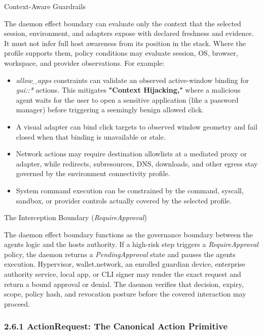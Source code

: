 \documentclass[
  11pt,
]{article}
\providecommand{\tightlist}{%
  \setlength{\itemsep}{0pt}\setlength{\parskip}{0pt}}
\begin{document}
Context-Aware Guardrails

The daemon effect boundary can evaluate only the context that the selected
session, environment, and adapters expose with declared freshness and evidence.
It must not infer full host awareness from its position in the stack. Where the
profile supports them, policy conditions may evaluate session, OS, browser,
workspace, and provider observations. For example:

\begin{itemize}
\tightlist
\item
  \emph{allow\_apps} constraints can validate an observed active-window binding
  for \emph{gui::*} actions. This mitigates \textbf{"Context Hijacking,"}
  where a malicious agent waits for the user to open a sensitive
  application (like a password manager) before triggering a seemingly
  benign allowed click.
\item
  A visual adapter can bind click targets to observed window geometry and fail
  closed when that binding is unavailable or stale.
\item
  Network actions may require destination allowlists at a mediated proxy or
  adapter, while redirects, subresources, DNS, downloads, and other egress stay
  governed by the environment connectivity profile.
\item
  System command execution can be constrained by the command, syscall,
  sandbox, or provider controls actually covered by the selected profile.
\end{itemize}

The Interception Boundary (\emph{RequireApproval})

The daemon effect boundary functions as the governance boundary between
the agent\textquotesingle s logic and the host\textquotesingle s
authority.
If a high-risk step triggers a \emph{RequireApproval} policy, the
daemon returns a \emph{PendingApproval} state and pauses the
agent\textquotesingle s execution. Hypervisor, wallet.network, an enrolled
guardian device, enterprise authority service, local app, or CLI signer may
render the exact request and return a bound approval or denial. The daemon
verifies that decision, expiry, scope, policy hash, and revocation posture
before the covered interaction may proceed.

\hypertarget{actionrequest-the-canonical-action-primitive}{%
\subsubsection{2.6.1 ActionRequest: The Canonical Action
Primitive}\label{actionrequest-the-canonical-action-primitive}}
\end{document}
